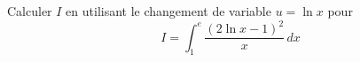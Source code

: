 Calculer $I$ en utilisant le changement de variable $u = \ln x$ pour
\begin{displaymath}
 I = \int_1^e\frac{(2\ln x - 1)^2}{x}\,dx
\end{displaymath}

\bigskip
